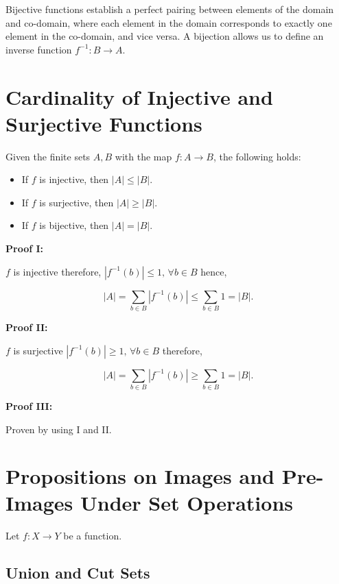 Bijective functions establish a perfect pairing between elements of the domain and co-domain, where each 
element in the domain corresponds to exactly one element in the co-domain, and vice versa. A bijection 
allows us to define an inverse function \(f^{-1}: B \to A\).

\section{Cardinality of Injective and Surjective Functions}

Given the finite sets \(A,B\) with the map \(f: A \to B\), the following holds: 

\begin{itemize}

	\item If \(f\) is injective, then \(|A| \le |B|\). 

	\item If \(f\) is surjective, then \(|A| \ge |B|\).

	\item If \(f\) is bijective, then \(|A| = |B|\).

\end{itemize}

\textbf{Proof I:}

\(f\) is injective therefore, \(|f^{-1}(b)| \le 1, \, \forall b \in B\) hence,

\[
	|A| = \sum_{b \in B} |f^{-1}(b)| \le \sum_{b \in B} 1 = |B|.
\]

\QED

\textbf{Proof II:}

\(f\) is surjective \(|f^{-1}(b)| \ge 1, \, \forall b \in B\) therefore,

\[
	|A| = \sum_{b \in B} |f^{-1}(b)| \ge \sum_{b \in B} 1 = |B|.
\]

\QED

\textbf{Proof III:}

Proven by using I and II. 

\QED

\section{Propositions on Images and Pre-Images Under Set Operations}

Let \( f : X \to Y \) be a function.

\subsection{Union and Cut Sets}

